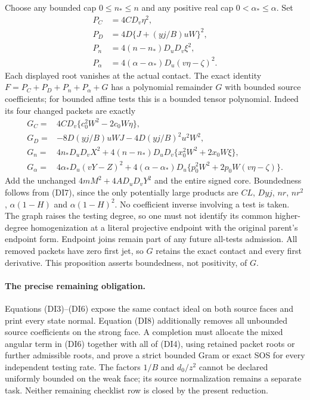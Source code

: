 Choose any bounded cap $0\le n_*\le n$ and any positive real cap
$0<\alpha_*\le\alpha$.  Set
\[
\begin{split}
 P_C&=4CD_v\eta^2,\\
 P_D&=4D\{J+(yj/B)uW\}^2,\\
 P_n&=4(n-n_*)D_uD_v\xi^2,\\
 P_\alpha&=4(\alpha-\alpha_*)D_u(v\eta-\zeta)^2.
\end{split}                                                    \tag{DI8}
\]
Each displayed root vanishes at the actual contact.  The exact identity
$F=P_C+P_D+P_n+P_\alpha+G$ has a polynomial remainder $G$ with
bounded source coefficients; for bounded affine tests this is a bounded
tensor polynomial.  Indeed its four changed packets are
exactly
\[
\begin{split}
 G_C={}&4CD_v\{c_0^2W^2-2c_0W\eta\},\\
 G_D={}&-8D(yj/B)uWJ-4D(yj/B)^2u^2W^2,\\
 G_n={}&4n_*D_uD_vX^2
 +4(n-n_*)D_uD_v\{x_0^2W^2+2x_0W\xi\},\\
 G_\alpha={}&4\alpha_*D_u(vY-Z)^2
 +4(\alpha-\alpha_*)D_u\{p_0^2W^2+2p_0W(v\eta-\zeta)\}.
\end{split}                                                    \tag{DI9}
\]
Add the unchanged $4mM^2+4AD_uD_vY^2$ and the entire signed core.
Boundedness follows from (DI7), since the only potentially large
products are $CL$, $Dyj$, $nr$, $nr^2$, $\alpha(1-H)$ and
$\alpha(1-H)^2$.  No coefficient inverse involving a test is
taken.  The graph raises the testing degree, so one must not identify
its common higher-degree homogenization at a literal projective endpoint
with the original parent's endpoint form.  Endpoint joins remain part
of any future all-tests admission.  All removed packets have zero first
jet, so $G$ retains the
exact contact and every first derivative.  This proposition asserts
boundedness, not positivity, of $G$.

\paragraph{The precise remaining obligation.}
Equations (DI3)--(DI6) expose the same contact ideal on both source
faces and print every state normal.  Equation (DI8) additionally
removes all unbounded source coefficients on the strong face.
A completion must allocate the mixed angular term in (DI6) together
with all of (DI4), using retained packet roots or further admissible
roots, and prove a strict bounded Gram or exact SOS for every
independent testing rate.  The factors $1/B$ and $d_0/z^2$ cannot be
declared uniformly bounded on the weak face; its source normalization
remains a separate task.  Neither remaining checklist row is closed
by the present reduction.
